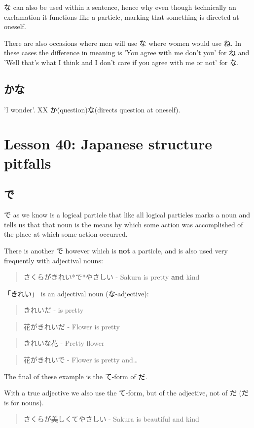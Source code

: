 \documentclass[11pt]{article}
\begin{document}
な can also be used within a sentence, hence why even though technically an exclamation it functions like a particle, marking that something is directed at oneself.

There are also occasions where men will use な where women would use ね. In these cases the difference in meaning is 'You agree with me don't you' for ね and 'Well that's what I think and I don't care if you agree with me or not' for な.

\subsection{かな}
\label{sec:orge295329}
'I wonder'. XX か(question)な(directs question at oneself).

\section{Lesson 40: Japanese structure pitfalls}
\label{sec:org330ff56}
\subsection{で}
\label{sec:org90629ad}
で as we know is a logical particle that like all logical particles marks a noun and tells us that that noun is the means by which some action was accomplished of the place at which some action occurred.

There is another で however which is \textbf{not} a particle, and is also used very frequently with adjectival nouns:
\begin{quote}
さくらがきれい*で*やさしい - Sakura is pretty \textbf{and} kind
\end{quote}
「きれい」 is an adjectival noun (な-adjective):
\begin{quote}
きれいだ - is pretty
\end{quote}
\begin{quote}
花がきれいだ - Flower is pretty
\end{quote}
\begin{quote}
きれいな花 - Pretty flower
\end{quote}
\begin{quote}
花がきれいで - Flower is pretty and\ldots{}
\end{quote}
The final of these example is the て-form of だ.

With a true adjective we also use the て-form, but of the adjective, not of だ (だ is for nouns).
\begin{quote}
さくらが美しくてやさしい - Sakura is beautiful and kind
\end{quote}
\end{document}
